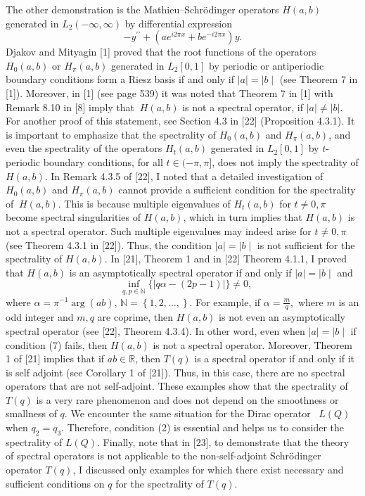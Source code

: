 \documentclass{article}%
\begin{document}
The other demonstration is the Mathieu--Schr\"{o}dinger operators $H(a,b)$
generated in $L_{2}(-\infty,\infty)$ by differential expression
\begin{equation}
-y^{\prime\prime}+(ae^{i2\pi x}+be^{-i2\pi x})y. \tag{6}%
\end{equation}
Djakov and Mityagin [1] proved that the root functions of the operators
$H_{0}(a,b)$ or $H_{\pi}(a,b)$ generated in $L_{2}[0,1]$ by periodic or
antiperiodic boundary conditions form a Riesz basis if and only if $\mid
a\mid=\mid b\mid$ (see Theorem 7 in [1]). Moreover, in [1] (see page 539) it
was noted that Theorem 7 in [1] with Remark 8.10 in [8] imply that $\ H(a,b)$
is not a spectral operator, if $|a|\neq\left\vert b\right\vert .$ For another
proof of this statement, see Section 4.3 in [22] (Proposition 4.3.1). It is
important to emphasize that the spectrality of $H_{0}(a,b)$ and $H_{\pi}%
(a,b)$, and even the spectrality of the operators $H_{t}(a,b)$ generated in
$L_{2}[0,1]$ by $t$-periodic boundary conditions, for all $t\in(-\pi,\pi]$,
does not imply the spectrality of $H(a,b)$. In Remark 4.3.5 of [22], I noted
that a detailed investigation of $H_{0}(a,b)$ and $H_{\pi}(a,b)$ cannot
provide a sufficient condition for the spectrality of $\ H(a,b)$. This is
because multiple eigenvalues of $H_{t}(a,b)$ for $t\neq0,\pi$ become spectral
singularities of $H(a,b)$, which in turn implies that $H(a,b)$ is not a
spectral operator. Such multiple eigenvalues may indeed arise for $t\neq0,\pi$
(see Theorem 4.3.1 in [22]). Thus, the condition $\mid a\mid=\mid b\mid$ is
not sufficient for the spectrality of $H(a,b)$. In [21], Theorem 1 and in [22]
Theorem 4.1.1, I proved that $H(a,b)$ is an asymptotically spectral operator
if and only if $\mid a\mid=\mid b\mid$ and
\begin{equation}
\text{ }\inf_{q,p\in\mathbb{N}}\{\mid q\alpha-(2p-1)\mid\}\neq0, \tag{7}%
\end{equation}
where $\alpha=\pi^{-1}\arg(ab)$, $\mathbb{N=}\left\{  1,2,...,\right\}  .$ For
example, if $\alpha=\frac{m}{q},$ where $m$ is an odd integer and $m,q$ are
coprime, then $H(a,b)$ is not even an asymptotically spectral operator (see
[22], Theorem 4.3.4). In other word, even when $\mid a\mid=\mid b\mid$ if
condition (7) fails, then $H(a,b)$ is not a spectral operator. Moreover,
Theorem 1 of [21] implies that if $ab\in\mathbb{R}$, then $T(q)$ is a spectral
operator if and only if it is self adjoint (see Corollary 1 of [21]). Thus, in
this case, there are no spectral operators that are not self-adjoint. These
examples show that the spectrality of $T(q)$ is a very rare phenomenon and
does not depend on the smoothness or smallness of $q.$ We encounter the same
situation for the Dirac operator \ $L(Q)$ when $q_{2}=q_{3}.$ Therefore,
condition (2) is essential and helps us to consider the spectrality of $L(Q).$
Finally, note that in [23], to demonstrate that the theory of spectral
operators is not applicable to the non-self-adjoint Schr\"{o}dinger operator
$T(q)$, I discussed only examples for which there exist necessary and
sufficient conditions on $q$ for the spectrality of $T(q).$
\end{document}
